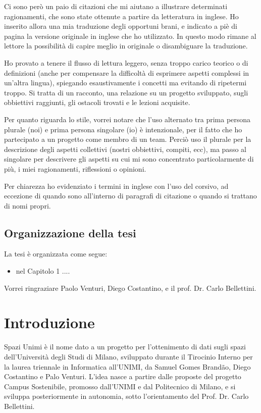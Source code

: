 \documentclass[12pt]{report}
\begin{document}
Ci sono però un paio di citazioni che mi aiutano a illustrare determinati
ragionamenti, che sono state ottenute a partire da letteratura in inglese.
Ho inserito allora una mia traduzione degli opportuni brani, e indicato
a piè di pagina la versione originale in inglese che ho utilizzato. In questo
modo rimane al lettore la possibilità di capire meglio in originale
o disambiguare la traduzione.

Ho provato a tenere il flusso di lettura leggero, senza troppo carico
teorico o di definizioni (anche per compensare la difficoltà di esprimere
aspetti complessi in un'altra lingua), spiegando esaustivamente i 
concetti ma evitando di ripetermi troppo. Si tratta di un racconto, 
una relazione su un progetto sviluppato, sugli obbiettivi raggiunti, 
gli ostacoli trovati e le lezioni acquisite.

Per quanto riguarda lo stile, vorrei notare che l'uso alternato tra prima
persona plurale (noi) e prima persona singolare (io) è intenzionale, per
il fatto che ho partecipato a un progetto come membro di un team. Perciò
uso il plurale per la descrizione degli aspetti collettivi 
(nostri obbiettivi, compiti, ecc), ma passo al singolare per descrivere gli
aspetti su cui mi sono concentrato particolarmente di più, i miei
ragionamenti, riflessioni o opinioni.

Per chiarezza ho evidenziato i termini in inglese con l'uso del corsivo, 
ad eccezione di quando sono all'interno di paragrafi di citazione o quando
si trattano di nomi propri.

%
%
\section*{Organizzazione della tesi}
\label{organizzazione}
La tesi \`e organizzata come segue:
\begin{itemize}
\item nel Capitolo 1 ....
\end{itemize}
%
%
Vorrei ringraziare Paolo Venturi, Diego Costantino, 
e il prof. Dr. Carlo Bellettini. 
\afterpreface


% 
% 
\chapter{Introduzione}
\label{cap1}

Spazi Unimi è il nome dato a un progetto per l'ottenimento di dati sugli 
spazi dell’Università degli Studi di Milano, sviluppato durante il 
Tirocinio Interno per la laurea triennale in Informatica all’UNIMI, 
da Samuel Gomes Brandão, Diego Costantino e Palo Venturi. L'idea 
nasce a partire dalle proposte del progetto Campus Sostenibile, 
promosso dall’UNIMI e dal Politecnico di Milano, e si sviluppa 
posteriormente in autonomia, sotto l'orientamento del Prof. Dr. Carlo Bellettini.
\end{document}
